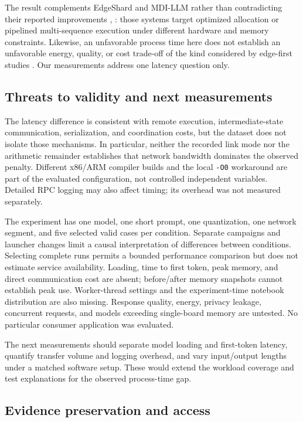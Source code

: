 \documentclass[letterpaper,conference]{IEEEtran}
\begin{document}
The result complements EdgeShard and MDI-LLM rather than contradicting their reported improvements \cite{mdillm}, \cite{edgeshard}: those systems target optimized allocation or pipelined multi-sequence execution under different hardware and memory constraints. Likewise, an unfavorable process time here does not establish an unfavorable energy, quality, or cost trade-off of the kind considered by edge-first studies \cite{edgefirst}. Our measurements address one latency question only.

\subsection{Threats to validity and next measurements}

The latency difference is consistent with remote execution, intermediate-state communication, serialization, and coordination costs, but the dataset does not isolate those mechanisms. In particular, neither the recorded link mode nor the arithmetic remainder establishes that network bandwidth dominates the observed penalty. Different x86/ARM compiler builds and the local \texttt{-O0} workaround are part of the evaluated configuration, not controlled independent variables. Detailed RPC logging may also affect timing; its overhead was not measured separately.

The experiment has one model, one short prompt, one quantization, one network segment, and five selected valid cases per condition. Separate campaigns and launcher changes limit a causal interpretation of differences between conditions. Selecting complete runs permits a bounded performance comparison but does not estimate service availability. Loading, time to first token, peak memory, and direct communication cost are absent; before/after memory snapshots cannot establish peak use. Worker-thread settings and the experiment-time notebook distribution are also missing. Response quality, energy, privacy leakage, concurrent requests, and models exceeding single-board memory are untested. No particular consumer application was evaluated.

The next measurements should separate model loading and first-token latency, quantify transfer volume and logging overhead, and vary input/output lengths under a matched software setup. These would extend the workload coverage and test explanations for the observed process-time gap.

\subsection{Evidence preservation and access}
\end{document}
